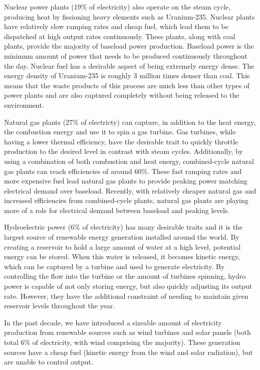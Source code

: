	Nuclear power plants (19\% of electricity) also operate on the steam cycle, producing heat by fissioning heavy elements such as Uranium-235.  Nuclear plants have relatively slow ramping rates and cheap fuel, which lead them to be dispatched at high output rates continuously.  These plants, along with coal plants, provide the majority of baseload power production. Baseload power is the minimum amount of power that needs to be produced continuously throughout the day.  Nuclear fuel has a desirable aspect of being extremely energy dense.  The energy density of Uranium-235 is roughly 3 million times denser than coal.  This means that the waste products of this process are much less than other types of power plants and are also captured completely without being released to the environment.

	Natural gas plants (27\% of electricty) can capture, in addition to the heat energy, the combustion energy and use it to spin a gas turbine.  Gas turbines, while having a lower thermal efficiency, have the desirable trait to quickly throttle production to the desired level in contrast with steam cycles.  Additionally, by using a combination of both combustion and heat energy, combined-cycle natural gas plants can reach efficiencies of around 60\%.  These fast ramping rates and more expensive fuel lead natural gas plants to provide peaking power matching electrical demand over baseload.  Recently, with relatively cheaper natural gas and increased efficiencies from combined-cycle plants, natural gas plants are playing more of a role for electrical demand between baseload and peaking levels.    

	Hydroelectric power (6\% of electricity) has many desirable traits and it is the largest source of renewable energy generation installed around the world.  By creating a reservoir to hold a large amount of water at a high level, potential energy can be stored.  When this water is released, it becomes kinetic energy, which can be captured by a turbine and used to generate electricity.  By controlling the flow into the turbine or the amount of turbines spinning, hydro power is capable of not only storing energy, but also quickly adjusting its output rate.  However, they have the additional constraint of needing to maintain given reservoir levels throughout the year.

	In the past decade, we have introduced a sizeable amount of electricity production from renewable sources such as wind turbines and solar panels (both total 6\% of electricity, with wind comprising the majority).  These generation sources have a cheap fuel (kinetic energy from the wind and solar radiation), but are unable to control output.  

